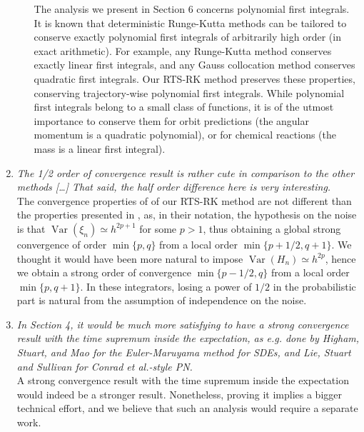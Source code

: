 \documentclass{siamart1116}
\numberwithin{theorem}{section}
\newcommand{\Var}{\operatorname{Var}}
\begin{document}
\begin{enumerate}[label=\arabic{*}.]
\begin{enumerate}
		The analysis we present in Section 6 concerns polynomial first integrals. It is known that deterministic Runge-Kutta methods can be tailored to conserve exactly polynomial first integrals of arbitrarily high order (in exact arithmetic). For example, any Runge-Kutta method conserves exactly linear first integrals, and any Gauss collocation method conserves quadratic first integrals. Our RTS-RK method preserves these properties, conserving trajectory-wise polynomial first integrals. While polynomial first integrals belong to a small class of functions, it is of the utmost importance to conserve them for orbit predictions (the angular momentum is a quadratic polynomial), or for chemical reactions (the mass is a linear first integral).
	\end{enumerate}
	\item \textit{The 1/2 order of convergence result is rather cute in comparison to the other methods [\ldots]  That said, the half order difference here is very interesting.} \\ 
	The convergence properties of of our RTS-RK method are not different than the properties presented in \cite{CGS16}, as, in their notation, the hypothesis on the noise is that $\Var(\xi_n) \simeq h^{2p+1}$ for some $p > 1$, thus obtaining a global strong convergence of order $\min\{p, q\}$ from a local order $\min\{p+1/2, q+1\}$. We thought it would have been more natural to impose $\Var(H_n) \simeq h^{2p}$, hence we obtain a strong order of convergence $\min\{p-1/2, q\}$ from a local order $\min\{p, q+1\}$. In these integrators, losing a power of $1/2$ in the probabilistic part is natural from the assumption of independence on the noise. 
	\item \textit{In Section 4, it would be much more satisfying to have a strong convergence result with the time supremum inside the expectation, as e.g. done by Higham, Stuart, and Mao for the Euler-Maruyama method for SDEs, and Lie, Stuart and Sullivan for Conrad et al.-style PN.} \\
	A strong convergence result with the time supremum inside the expectation would indeed be a stronger result. Nonetheless, proving it implies a bigger technical effort, and we believe that such an analysis would require a separate work.
\end{enumerate}
\end{document}
